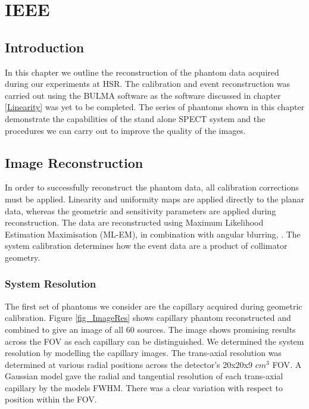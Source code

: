 \chapter{IEEE}
\label{IEEE}


\section{Introduction}
In this chapter we outline the reconstruction of the phantom data acquired during our experiments at \acrshort{HSR}. The calibration and event reconstruction was carried out using the BULMA software as the software discussed in chapter \ref{Linearity} was yet to be completed. The series of phantoms shown in this chapter demonstrate the capabilities of the stand alone SPECT system and the procedures we can carry out to improve the quality of the images. 


\section{Image Reconstruction}
In order to successfully reconstruct the phantom data, all calibration corrections must be applied. Linearity and uniformity maps are applied directly to the planar data, whereas the geometric and sensitivity parameters are applied during reconstruction. The data are reconstructed using Maximum Likelihood Estimation Maximisation (ML-EM), \cite{4307558} in combination with angular blurring, \cite{bousse2013angular}. The system calibration determines how the event data are a product of collimator geometry.

\subsection{System Resolution}
The first set of phantoms we consider are the capillary acquired during geometric calibration. Figure \ref{fig_ImageRes} shows capillary phantom reconstructed and combined to give an image of all 60 sources. The image shows promising results across the \acrshort{FOV} as each capillary can be distinguished. We determined the system resolution by modelling the capillary images. The trans-axial resolution was determined at various radial positions across the detector's 20x20x9 $cm^3$ \acrshort{FOV}. A Gaussian model gave the radial and tangential resolution of each trans-axial capillary by the models \acrshort{FWHM}. There was a clear variation with respect to position within the \acrshort{FOV}.

